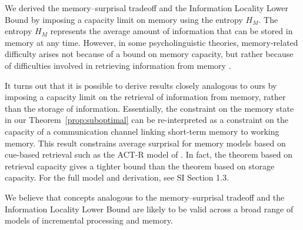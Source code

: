 We derived the memory--surprisal tradeoff and the Information Locality Lower Bound by imposing a capacity limit on memory using the entropy $H_M$. The entropy $H_M$ represents the average amount of information that can be stored in memory at any time. However, in some psycholinguistic theories, memory-related difficulty arises not because of a bound on memory capacity, but rather because of difficulties involved in retrieving information from memory \citep{mcelree2000sentence,lewis-activation-based-2005,nicenboim2018models,vasishth2019computational}. 

It turns out that it is possible to derive results closely analogous to ours by imposing a capacity limit on the retrieval of information from memory, rather than the storage of information. Essentially, the constraint on the memory state in our Theorem~\ref{prop:suboptimal} can be re-interpreted as a constraint on the capacity of a communication channel linking short-term memory to working memory. This result constrains average surprisal for memory models based on cue-based retrieval such as the ACT-R model of \citet{lewis-activation-based-2005}. In fact, the theorem based on retrieval capacity gives a tighter bound than the theorem based on storage capacity. For the full model and derivation, see SI Section 1.3. 

We believe that concepts analogous to the memory--surprisal tradeoff and the Information Locality Lower Bound are likely to be valid across a broad range of models of incremental processing and memory.
